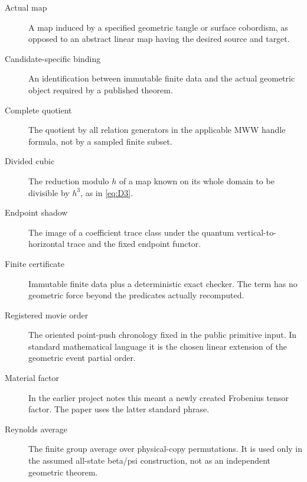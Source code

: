 \documentclass[10pt,reqno]{amsart}
\theoremstyle{definition}
\theoremstyle{remark}
\begin{document}
\begin{description}
\item[Actual map]
A map induced by a specified geometric tangle or surface cobordism, as
opposed to an abstract linear map having the desired source and target.
\item[Candidate-specific binding]
An identification between immutable finite data and the actual geometric
object required by a published theorem.
\item[Complete quotient]
The quotient by all relation generators in the applicable MWW handle formula,
not by a sampled finite subset.
\item[Divided cubic]
The reduction modulo $h$ of a map known on its whole domain to be divisible by
$h^3$, as in \cref{eq:D3}.
\item[Endpoint shadow]
The image of a coefficient trace class under the quantum
vertical-to-horizontal trace and the fixed endpoint functor.
\item[Finite certificate]
Immutable finite data plus a deterministic exact checker.  The term has no
geometric force beyond the predicates actually recomputed.
\item[Registered movie order]
The oriented point-push chronology fixed in the public primitive input.  In
standard mathematical language it is the chosen linear extension of the
geometric event partial order.
\item[Material factor]
In the earlier project notes this meant a newly created Frobenius tensor
factor.  The paper uses the latter standard phrase.
\item[Reynolds average]
The finite group average over physical-copy permutations.  It is used only in
the assumed all-state beta/psi construction, not as an independent geometric
theorem.
\end{description}



\end{document}
